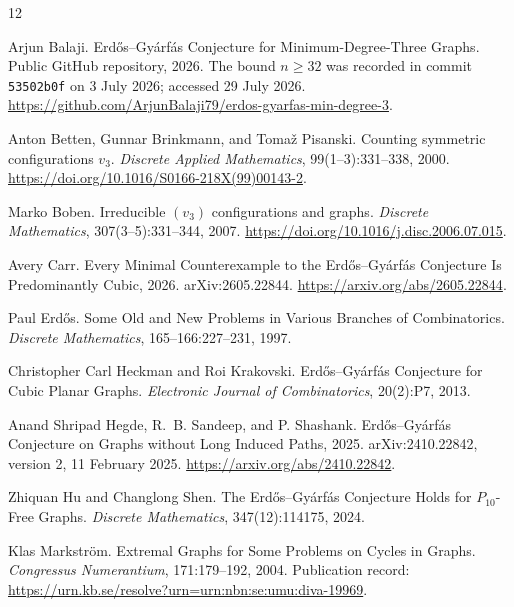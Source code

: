 \documentclass[11pt]{article}
\theoremstyle{definition}
\newcommand{\code}[1]{\texttt{#1}}
\begin{document}
\begin{thebibliography}{12}

Arjun Balaji.
\newblock Erd\H{o}s--Gy\'arf\'as Conjecture for Minimum-Degree-Three Graphs.
\newblock Public GitHub repository, 2026. The bound \(n\geq32\) was recorded
in commit \code{53502b0f} on 3 July 2026; accessed 29 July 2026.
\newblock \url{https://github.com/ArjunBalaji79/erdos-gyarfas-min-degree-3}.

Anton Betten, Gunnar Brinkmann, and Toma\v{z} Pisanski.
\newblock Counting symmetric configurations \(v_3\).
\newblock \emph{Discrete Applied Mathematics}, 99(1--3):331--338, 2000.
\newblock \url{https://doi.org/10.1016/S0166-218X(99)00143-2}.

Marko Boben.
\newblock Irreducible \((v_3)\) configurations and graphs.
\newblock \emph{Discrete Mathematics}, 307(3--5):331--344, 2007.
\newblock \url{https://doi.org/10.1016/j.disc.2006.07.015}.

Avery Carr.
\newblock Every Minimal Counterexample to the Erd\H{o}s--Gy\'arf\'as
Conjecture Is Predominantly Cubic, 2026.
\newblock arXiv:2605.22844.
\newblock \url{https://arxiv.org/abs/2605.22844}.

Paul Erd\H{o}s.
\newblock Some Old and New Problems in Various Branches of Combinatorics.
\newblock \emph{Discrete Mathematics}, 165--166:227--231, 1997.

Christopher Carl Heckman and Roi Krakovski.
\newblock Erd\H{o}s--Gy\'arf\'as Conjecture for Cubic Planar Graphs.
\newblock \emph{Electronic Journal of Combinatorics}, 20(2):P7, 2013.

Anand Shripad Hegde, R.~B. Sandeep, and P. Shashank.
\newblock Erd\H{o}s--Gy\'arf\'as Conjecture on Graphs without Long Induced
Paths, 2025.
\newblock arXiv:2410.22842, version 2, 11 February 2025.
\newblock \url{https://arxiv.org/abs/2410.22842}.

Zhiquan Hu and Changlong Shen.
\newblock The Erd\H{o}s--Gy\'arf\'as Conjecture Holds for \(P_{10}\)-Free
Graphs.
\newblock \emph{Discrete Mathematics}, 347(12):114175, 2024.

Klas Markstr\"om.
\newblock Extremal Graphs for Some Problems on Cycles in Graphs.
\newblock \emph{Congressus Numerantium}, 171:179--192, 2004.
\newblock Publication record:
\url{https://urn.kb.se/resolve?urn=urn:nbn:se:umu:diva-19969}.


\end{thebibliography}
\end{document}
